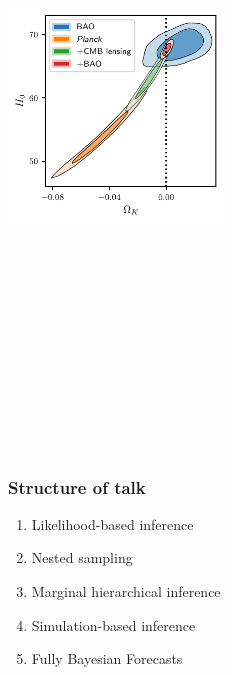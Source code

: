 \documentclass[aspectratio=169]{beamer}
\begin{document}
\begin{frame}
\begin{columns}
        \includegraphics[height=0.5\textwidth]{figures/curvature_3}
    \end{columns}
\end{frame}

\begin{frame}
    \frametitle{Structure of talk}
    \begin{enumerate}
        \item Likelihood-based inference
        \item Nested sampling
        \item Marginal hierarchical inference
        \item Simulation-based inference
        \item Fully Bayesian Forecasts
    \end{enumerate}
\end{frame}
\end{document}
